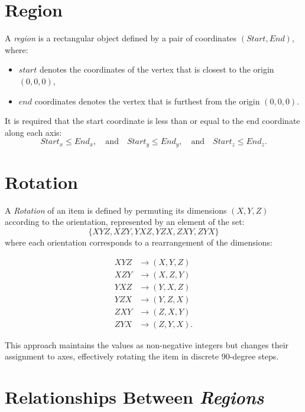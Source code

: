 \section{Region}

A \textit{region} is a rectangular object defined by a pair of coordinates $(\mathit{Start}, \mathit{End})$, where:

\begin{itemize}
    \item $\mathit{start}$ denotes the coordinates of the vertex that is closest to the origin $(0, 0, 0)$,
    \item $\mathit{end}$ coordinates denotes the vertex that is furthest from the origin $(0, 0, 0)$.
\end{itemize}

It is required that the start coordinate is less than or equal to the end coordinate along each axis:
\[
\mathit{Start}_x \leq \mathit{End}_x, \quad \text{and} \quad  
\mathit{Start}_y \leq \mathit{End}_y, \quad \text{and} \quad 
\mathit{Start}_z \leq \mathit{End}_z.
\]


\section{Rotation}

A \textit{Rotation} of an item is defined by permuting its dimensions $(X, Y, Z)$ according to the orientation, represented by an element of the set:
\[
\{ XYZ, XZY, YXZ, YZX, ZXY, ZYX \}
\]
where each orientation corresponds to a rearrangement of the dimensions:

\[
\begin{aligned}
XYZ &\to (X, Y, Z) \\
XZY &\to (X, Z, Y) \\
YXZ &\to (Y, X, Z) \\
YZX &\to (Y, Z, X) \\
ZXY &\to (Z, X, Y) \\
ZYX &\to (Z, Y, X).
\end{aligned}
\]

This approach maintains the values as non-negative integers but changes their assignment to axes, effectively rotating the item in discrete 90-degree steps.





\section{Relationships Between \textit{Regions}}

